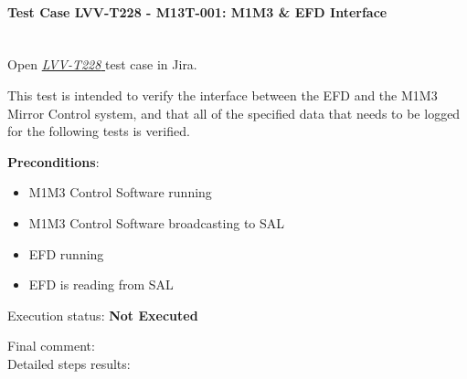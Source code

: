 \documentclass[SE,lsstdraft,STR,toc]{lsstdoc}
\providecommand{\tightlist}{
  \setlength{\itemsep}{0pt}\setlength{\parskip}{0pt}}
\begin{document}
\paragraph{Test Case LVV-T228 - M13T-001: M1M3 \& EFD Interface }\mbox{}\\

Open  \href{https://jira.lsstcorp.org/secure/Tests.jspa#/testCase/LVV-T228}{\textit{ LVV-T228 } }
test case in Jira.

This test is intended to verify the interface between the EFD and the
M1M3 Mirror Control system, and that all of the specified data that
needs to be logged for the following tests is verified.~

\textbf{ Preconditions}:\\
\begin{itemize}
\tightlist
\item
  M1M3 Control Software running
\item
  M1M3 Control Software broadcasting to SAL
\item
  EFD running
\item
  EFD is reading from SAL~
\end{itemize}

Execution status: {\bf Not Executed }

Final comment:\\


Detailed steps results:
\end{document}
